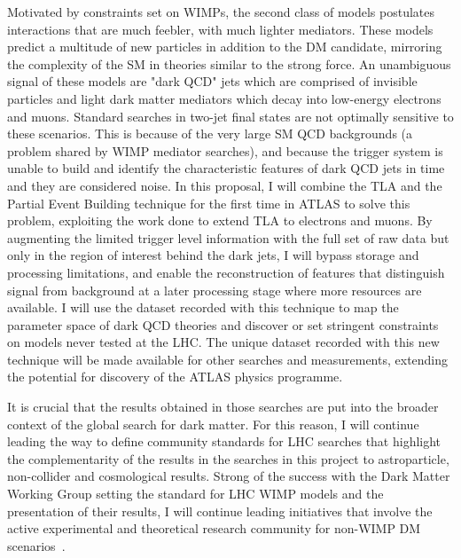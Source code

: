 \documentclass[11pt,a4paper]{article}
\begin{document}
Motivated by constraints set on WIMPs, the second class of models postulates interactions that are much feebler, with much lighter mediators. 
These models~\cite{Zurek} predict a multitude of new particles in addition to the DM candidate, mirroring the complexity of the SM in theories similar to the strong force. An unambiguous signal of these models are "dark QCD" jets which are comprised of invisible particles and light dark matter mediators which decay into low-energy electrons and muons. 
Standard searches in two-jet final states are not optimally sensitive to these scenarios. %
This is because of the very large SM QCD backgrounds (a problem shared by WIMP mediator searches), and because the trigger system is unable to build and identify the characteristic features of dark QCD jets in time and they are considered noise. 
In this proposal, I will combine the TLA and the Partial Event Building technique for the first time in ATLAS to solve this problem, exploiting the work done to extend TLA to electrons and muons. %
By augmenting the limited trigger level information with the full set of raw data but only in the region of interest behind the dark jets, I will bypass storage and processing limitations, and enable the reconstruction of features that distinguish signal from background at a later processing stage where more resources are available. 
I will use the dataset recorded with this technique to map the parameter space of dark QCD theories and discover or set stringent constraints on models never tested at the LHC. 
The unique dataset recorded with this new technique will be made available for other searches and measurements, extending the potential for discovery of the ATLAS physics programme. 

It is crucial that the results obtained in those searches are put into the broader context of the global search for dark matter. 
For this reason, I will continue leading the way to define community standards for LHC searches that highlight the complementarity of the results in the searches in this project to astroparticle, non-collider and cosmological results. 
Strong of the success with the Dark Matter Working Group setting the standard for LHC WIMP models and the presentation of their results, I will continue leading initiatives that involve the active experimental and theoretical research community for non-WIMP DM scenarios~\cite{BertoneTait, iDMEU}. 

\end{document}
